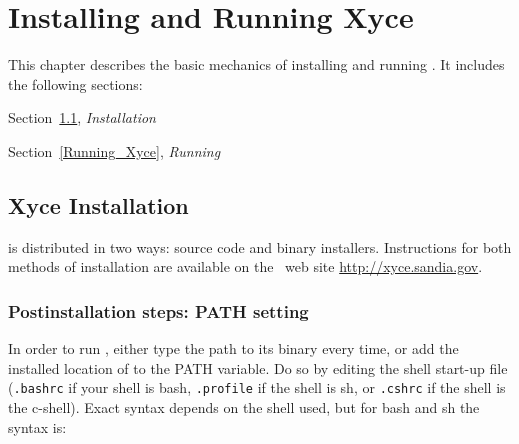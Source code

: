 



\chapter{Installing and Running Xyce}
\label{Running_Installing_Xyce}
{
This chapter describes the basic mechanics of installing and running
\Xyce{}.  It includes the following sections:
\begin{XyceItemize}
\item Section~\ref{Xyce_Installation}, {\em \Xyce{} Installation}
\item Section~\ref{Running_Xyce}, {\em Running \Xyce{}}
\end{XyceItemize}
}

\section{Xyce Installation}
\label{Xyce_Installation}

\Xyce{} is distributed in two ways: source code and binary installers.
Instructions for both methods of installation are available on the \Xyce\ web
site {\color{XyceDeepRed}\url{http://xyce.sandia.gov}}.

\subsection{Postinstallation steps: PATH setting}
In order to run \Xyce{}, either type the path to its binary every time, or
add the installed location of \Xyce{} to the PATH variable.  Do so by editing
the shell start-up file (\texttt{.bashrc} if your shell is bash,
\texttt{.profile} if the shell is sh, or \texttt{.cshrc} if the shell is the
c-shell).  Exact syntax depends on the shell used, but for bash and sh the
syntax is:

